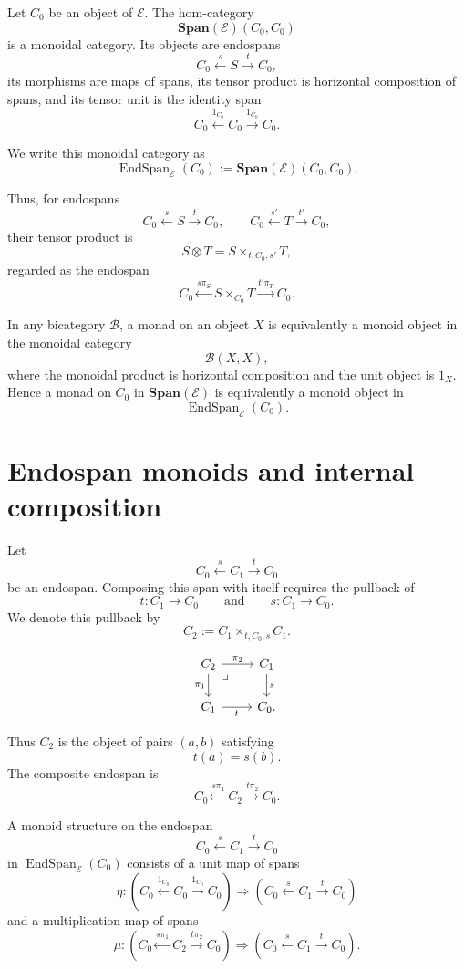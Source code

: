 Let \(C_0\) be an object of \(\mathcal E\). The hom-category
\[
\mathbf{Span}(\mathcal E)(C_0,C_0)
\]
is a monoidal category. Its objects are endospans
\[
C_0\xleftarrow{s}S\xrightarrow{t}C_0,
\]
its morphisms are maps of spans, its tensor product is horizontal composition of spans, and its tensor unit is the identity span
\[
C_0\xleftarrow{1_{C_0}}C_0\xrightarrow{1_{C_0}}C_0.
\]

We write this monoidal category as
\[
\operatorname{EndSpan}_{\mathcal E}(C_0)
:=
\mathbf{Span}(\mathcal E)(C_0,C_0).
\]

Thus, for endospans
\[
C_0\xleftarrow{s}S\xrightarrow{t}C_0,
\qquad
C_0\xleftarrow{s'}T\xrightarrow{t'}C_0,
\]
their tensor product is
\[
S\otimes T
=
S\times_{t,C_0,s'}T,
\]
regarded as the endospan
\[
C_0
\xleftarrow{s\pi_S}
S\times_{C_0}T
\xrightarrow{t'\pi_T}
C_0.
\]

\begin{remark}
\label{rem:monads-as-monoids-in-endohom}
In any bicategory \(\mathcal B\), a monad on an object \(X\) is equivalently a monoid object in the monoidal category
\[
\mathcal B(X,X),
\]
where the monoidal product is horizontal composition and the unit object is \(1_X\). Hence a monad on \(C_0\) in \(\mathbf{Span}(\mathcal E)\) is equivalently a monoid object in
\[
\operatorname{EndSpan}_{\mathcal E}(C_0).
\]
\end{remark}

\section{Endospan monoids and internal composition}
\label{sec:endospan-monoids-internal-composition}

Let
\[
C_0 \xleftarrow{s} C_1 \xrightarrow{t} C_0
\]
be an endospan. Composing this span with itself requires the pullback of
\[
t:C_1\to C_0
\qquad\text{and}\qquad
s:C_1\to C_0.
\]
We denote this pullback by
\[
C_2:=C_1\times_{t,C_0,s}C_1.
\]

\[
\begin{tikzcd}
C_2 \arrow[r, "\pi_2"] \arrow[d, "\pi_1"'] \arrow[dr, phantom, "\lrcorner", very near start]
&
C_1 \arrow[d, "s"]
\\
C_1 \arrow[r, "t"'] & C_0.
\end{tikzcd}
\]

Thus \(C_2\) is the object of pairs \((a,b)\) satisfying
\[
t(a)=s(b).
\]
The composite endospan is
\[
C_0
\xleftarrow{s\pi_1}
C_2
\xrightarrow{t\pi_2}
C_0.
\]

A monoid structure on the endospan
\[
C_0 \xleftarrow{s} C_1 \xrightarrow{t} C_0
\]
in \(\operatorname{EndSpan}_{\mathcal E}(C_0)\) consists of a unit map of spans
\[
\eta:
\left(
C_0\xleftarrow{1_{C_0}}C_0\xrightarrow{1_{C_0}}C_0
\right)
\Longrightarrow
\left(
C_0\xleftarrow{s}C_1\xrightarrow{t}C_0
\right)
\]
and a multiplication map of spans
\[
\mu:
\left(
C_0\xleftarrow{s\pi_1}C_2\xrightarrow{t\pi_2}C_0
\right)
\Longrightarrow
\left(
C_0\xleftarrow{s}C_1\xrightarrow{t}C_0
\right).
\]

